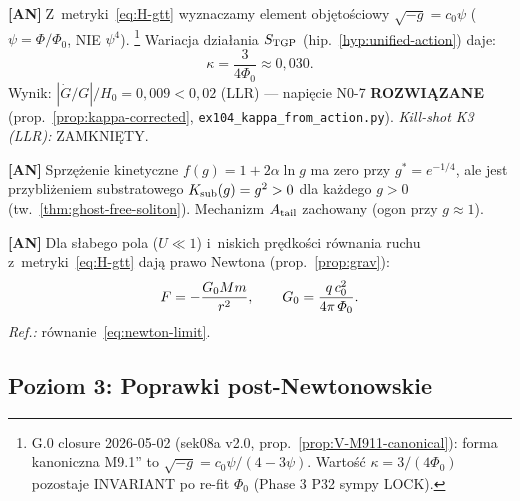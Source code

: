 \begin{chain}[A11b --- Zunifikowana akcja $S_{\rm TGP}$
  i~$\kappa = 3/(4\Phi_0)$]\label{chain:A11b}
  \textbf{[AN]}$\;$Z~metryki~\eqref{eq:H-gtt}
  wyznaczamy element obj\k{e}to\'sciowy $\sqrt{-g} = c_0\psi$
  ($\psi = \Phi/\Phi_0$, NIE $\psi^4$).%
  \footnote{G.0 closure 2026-05-02 (sek08a v2.0,
  prop.~\ref{prop:V-M911-canonical}): forma kanoniczna M9.1''
  to $\sqrt{-g} = c_0\psi/(4-3\psi)$. Warto\'s\'c $\kappa = 3/(4\Phi_0)$
  pozostaje INVARIANT po re-fit $\Phi_0$ (Phase 3 P32 sympy LOCK).}
  Wariacja dzia\l{}ania $S_{\rm TGP}$
  (hip.~\ref{hyp:unified-action}) daje:
  \begin{equation}
    \kappa = \frac{3}{4\Phi_0} \approx 0{,}030.
  \end{equation}
  Wynik: $|\dot G/G|/H_0 = 0{,}009 < 0{,}02$ (LLR) ---
  napi\k{e}cie N0-7 \textbf{ROZWI\k{A}ZANE}
  (prop.~\ref{prop:kappa-corrected},
  \texttt{ex104\_kappa\_from\_action.py}).
  \emph{Kill-shot K3 (LLR):} ZAMKNI\k{E}TY.
\end{chain}

\begin{chain}%
\label{chain:A11c}
  \textbf{[AN]}$\;$Sprzężenie kinetyczne $f(g) = 1 + 2\alpha\ln g$
  ma zero przy $g^* = e^{-1/4}$, ale jest przybli\.zeniem
  substratowego $K_{\rm sub}(g) = g^2 > 0$ dla ka\.zdego $g > 0$
  (tw.~\ref{thm:ghost-free-soliton}).
  Mechanizm $A_{\rm tail}$ zachowany (ogon przy $g \approx 1$).
\end{chain}

\begin{chain}\label{chain:A12}
  \textbf{[AN]}$\;$Dla s\l{}abego pola ($U \ll 1$)
  i~niskich pr\k{e}dko\'sci r\'ownania ruchu z~metryki~\eqref{eq:H-gtt}
  daj\k{a} prawo Newtona (prop.~\ref{prop:grav}):
  \begin{equation}\label{eq:H-newton}
    F = -\frac{G_0 M m}{r^2},\qquad
    G_0 = \frac{q\,c_0^2}{4\pi\,\varPhi_0}.
  \end{equation}
  \emph{Ref.:} r\'ownanie~\eqref{eq:newton-limit}.
\end{chain}

\subsection{Poziom 3: Poprawki post-Newtonowskie}%
\label{app:H-PN}

